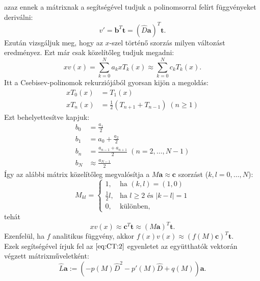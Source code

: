 \documentclass[oneside, titlepage, 12pt, a4paper]{report}
\begin{document}
azaz ennek a mátrixnak a segítségével tudjuk a polinomsorral felírt függvényeket deriválni:
\begin{equation*}
v' = \mathbf{b}^T \mathbf{t} = (\hat{D}\mathbf{a})^T \mathbf{t}.
\end{equation*}
Ezután vizsgáljuk meg, hogy az $x$-szel történő szorzás milyen változást eredményez. Ezt már csak közelítőleg tudjuk megadni:
\begin{equation*}
x v(x) = \sum_{k = 0}^N a_k x T_k(x) \approx \sum_{k = 0}^N c_k T_k(x).
\end{equation*}
Itt a Csebisev-polinomok rekurziójából gyorsan kijön a megoldás:
\begin{align*}
x T_0(x) &= T_1(x) \\
x T_n(x) &= \frac{1}{2} \left( T_{n+1} + T_{n-1} \right) \; (n \geq 1)
\end{align*}
Ezt behelyettesítve kapjuk:
\begin{align*}
b_0 &= \frac{a_1}{2} \\
b_1 &= a_0 + \frac{a_2}{2} \\
b_n &= \frac{a_{n-1} + a_{n+1}}{2} \; (n = 2, \dots, N-1) \\
b_N &\approx \frac{a_{N-1}}{2}
\end{align*}
Így az alábbi mátrix közelítőleg megvalósítja a $M \mathbf{a} \approx \mathbf{c}$ szorzást ($k, l = 0, \dots, N$):
\begin{equation*}
M_{kl} =
	\begin{cases}
	1, &\text{ha }(k, l) = (1, 0) \\
	\frac{1}{2}l, &\text{ha } l \geq 2 \text{ és } |k - l| = 1 \\
	0, &\text{különben},
	\end{cases}
\end{equation*}
tehát
\begin{equation*}
x v(x) \approx \mathbf{c}^T \mathbf{t} \approx (M \mathbf{a})^T \mathbf{t}.
\end{equation*}
Ezenfelül, ha $f$ analitikus függvény, akkor $f(x) v(x) \approx (f(M)\mathbf{c})^T \mathbf{t}$. \\ %
Ezek segítségével írjuk fel az $\eqref{eq:CT:2}$ egyenletet az együtthatók vektorán végzett mátrixműveletként:
\begin{equation*}
\hat{L} \mathbf{a} := \left( -p(M) \hat{D}^2 - p'(M) \hat{D} + q(M) \right) \mathbf{a}.
\end{equation*}
\end{document}

